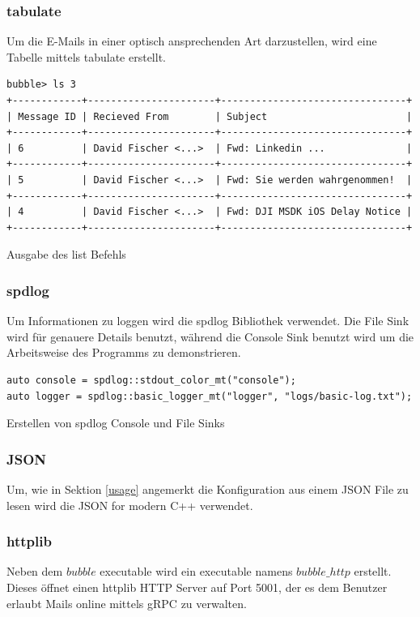 \documentclass[12pt, letterpaper]{article}
\newenvironment{code}{\captionsetup{type=listing}}{}
\begin{document}
\subsubsection{tabulate}
Um die E-Mails in einer optisch ansprechenden Art darzustellen, wird eine Tabelle mittels tabulate\cite{tabulate_ref} erstellt.

\begin{code}
  \begin{verbatim}
bubble> ls 3
+------------+----------------------+--------------------------------+
| Message ID | Recieved From        | Subject                        | 
+------------+----------------------+--------------------------------+
| 6          | David Fischer <...>  | Fwd: Linkedin ...              | 
+------------+----------------------+--------------------------------+
| 5          | David Fischer <...>  | Fwd: Sie werden wahrgenommen!  |
+------------+----------------------+--------------------------------+
| 4          | David Fischer <...>  | Fwd: DJI MSDK iOS Delay Notice |
+------------+----------------------+--------------------------------+
  \end{verbatim}
  \caption{Ausgabe des list Befehls}
\end{code}

\subsubsection{spdlog}
Um Informationen zu loggen wird die spdlog\cite{spdlog_ref} Bibliothek verwendet. Die File Sink wird für genauere Details benutzt, während die Console Sink benutzt wird um die Arbeitsweise des Programms zu demonstrieren.

\begin{code}
\begin{verbatim}
auto console = spdlog::stdout_color_mt("console");
auto logger = spdlog::basic_logger_mt("logger", "logs/basic-log.txt");
\end{verbatim}
\caption{Erstellen von spdlog Console und File Sinks}
\label{create_gnutls}
\end{code}

\subsubsection{JSON}
Um, wie in Sektion \ref{usage} angemerkt die Konfiguration aus einem JSON File zu lesen wird die JSON for modern C++\cite{json_ref} verwendet.

\subsubsection{httplib}
Neben dem $bubble$ executable wird ein executable namens $bubble\_http$ erstellt. Dieses öffnet einen httplib\cite{httplib-ref} HTTP Server auf Port 5001, der es dem Benutzer erlaubt Mails online mittels gRPC zu verwalten.
\end{document}
